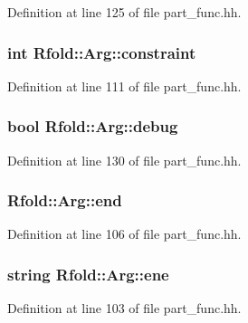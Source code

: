 Definition at line 125 of file part\+\_\+func.\+hh.

\hypertarget{class_rfold_1_1_arg_ab05512b7f96ce930ac13b873e7c298b1}{
\subsubsection[{constraint}]{\setlength{\rightskip}{0pt plus 5cm}int Rfold\+::\+Arg\+::constraint}}\label{class_rfold_1_1_arg_ab05512b7f96ce930ac13b873e7c298b1}


Definition at line 111 of file part\+\_\+func.\+hh.

\hypertarget{class_rfold_1_1_arg_ad6f2d65fd94879a530699ee4680e5d63}{
\subsubsection[{debug}]{\setlength{\rightskip}{0pt plus 5cm}bool Rfold\+::\+Arg\+::debug}}\label{class_rfold_1_1_arg_ad6f2d65fd94879a530699ee4680e5d63}


Definition at line 130 of file part\+\_\+func.\+hh.

\hypertarget{class_rfold_1_1_arg_ad5641c6dff38e98a3dadb60223a4b630}{
\subsubsection[{end}]{ Rfold\+::\+Arg\+::end}}\label{class_rfold_1_1_arg_ad5641c6dff38e98a3dadb60223a4b630}


Definition at line 106 of file part\+\_\+func.\+hh.

\hypertarget{class_rfold_1_1_arg_a3fc1f86f5f3f7b2572392b547a2ef6a9}{
\subsubsection[{ene}]{\setlength{\rightskip}{0pt plus 5cm}string Rfold\+::\+Arg\+::ene}}\label{class_rfold_1_1_arg_a3fc1f86f5f3f7b2572392b547a2ef6a9}


Definition at line 103 of file part\+\_\+func.\+hh.

